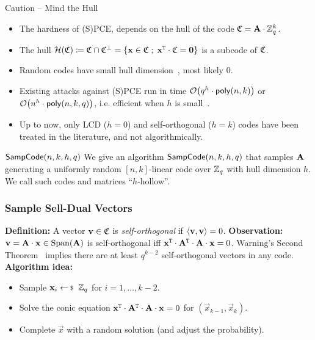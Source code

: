 \documentclass[xcolor=table,10pt,aspectratio=169]{beamer}
\begin{document}
\begin{frame}{Caution -- Mind the Hull}
  \begin{itemize}[label=\textbullet]
  \item The hardness of (S)PCE, depends on the hull of the code \(\mathfrak{C} = \mathbf{A} \cdot \mathbb{Z}_q^k\).
  \item The hull \(\mathcal{H}(\mathfrak{C}) \coloneqq \mathfrak{C} \cap \mathfrak{C}^\bot = \left\{ \mathbf{x} \in \mathfrak{C} \; ; \;  \mathbf{x}^{\mathtt{T}} \cdot \mathfrak{C} = \mathbf{0} \right\}\) is a subcode of \(\mathfrak{C}\).
  \item Random codes have small hull dimension~\cite{Sendrier1997}, most likely \(0\).
  \item Existing attacks against (S)PCE run in time \(\bigO{q^h \cdot \poly[n,k]}\) or \(\bigO{n^h \cdot \poly[n,k,q]}\), i.e. efficient when \(h\) is small~\cite{Sendrier2000SSA,BOST2019}.
  \item Up to now, only LCD (\(h=0\)) and self-orthogonal (\(h=k\)) codes have been treated in the literature, and not algorithmically.
  \end{itemize}


  \begin{block}{\(\mathsf{SampCode}(n,k,h,q)\)}
    We give an algorithm \(\mathsf{SampCode}(n,k,h,q)\) that samples \(\mathbf{A}\) generating a uniformly random \([n,k]\)-linear code over \(\mathbb{Z}_q\) with hull dimension \(h\). We call such codes and matrices ``\(h\)-hollow''.
  \end{block}
\end{frame}


\begin{frame}
  \frametitle{Sample Sell-Dual Vectors}
  \textbf{Definition:} A vector \(\mathbf{v} \in \mathfrak{C}\) is \emph{self-orthogonal} if \(\langle \mathbf{v}, \mathbf{v} \rangle = 0\).
  \vfill
  \textbf{Observation:} \(\mathbf{v} = \mathbf{A}\cdot\mathbf{x} \in \operatorname{Span}(\mathbf{A})\) is self-orthogonal iff \(\mathbf{x}^{\mathtt{T}}\cdot\mathbf{A}^{\mathtt{T}}\cdot\mathbf{A}\cdot\mathbf{x} = 0\).
  \vfill
  Warning's Second Theorem~\cite{ChevalleyWarning1935} implies there are at least \(q^{k-2}\) self-orthogonal vectors in any code.
  \vfill
  \textbf{Algorithm idea:}
  \begin{itemize}[label=\textbullet]
  \item Sample \(\vec{x}_i \sample \ZZ_q\) for \(i=1,\dots,k-2\).
  \item Solve the conic equation \(\mathbf{x}^{\mathtt{T}}\cdot\mathbf{A}^{\mathtt{T}}\cdot\mathbf{A}\cdot\mathbf{x} = 0\) for \((\vec{x}_{k-1},\vec{x}_k)\).
  \item Complete \(\vec{x}\) with a random solution (and adjust the probability).
  \end{itemize}
\end{frame}
\end{document}
